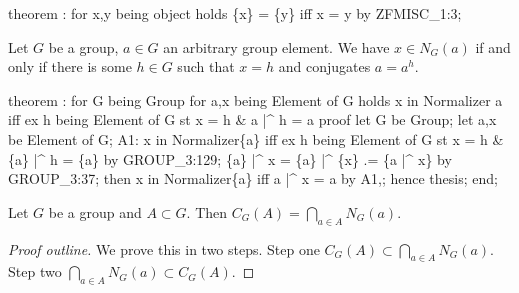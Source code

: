 \nwenddocs{}\endmoddef\nwstartdeflinemarkup{}\nwenddeflinemarkup
theorem :
  for x,y being object
  holds \{x\} = \{y\} iff x = y by ZFMISC_1:3;
\eatline
{}\nwendcode{}\nwdocspar
\begin{theorem}
Let $G$ be a group, $a\in G$ an arbitrary group element.
We have $x\in N_{G}(a)$ if and only if there is some $h\in G$
such that $x=h$ and conjugates $a = a^{h}$.
\end{theorem}

\nwenddocs{}\endmoddef\nwstartdeflinemarkup{}\nwenddeflinemarkup
theorem :
  for G being Group
  for a,x being Element of G
  holds x in Normalizer a iff ex h being Element of G st x = h & a |^ h = a
proof
  let G be Group;
  let a,x be Element of G;
  A1: x in Normalizer\{a\} iff ex h being Element of G st x = h & \{a\} |^ h = \{a\}
  by GROUP_3:129;
  \{a\} |^ x = \{a\} |^ \{x\}
          .= \{a |^ x\} by GROUP_3:37;
  then x in Normalizer\{a\} iff a |^ x = a by A1,;
  hence thesis;
end;
\eatline
{}\nwendcode{}\nwdocspar
\begin{theorem}
Let $G$ be a group and $A\subset G$.
Then $C_{G}(A) = \bigcap_{a\in A}N_{G}(a)$.
\end{theorem}

\begin{proof}[Proof outline]
We prove this in two steps. Step one $C_{G}(A)\subset \bigcap_{a\in A} N_{G}(a)$.
Step two $\bigcap_{a\in A} N_{G}(a) \subset C_{G}(A)$.
\end{proof}

